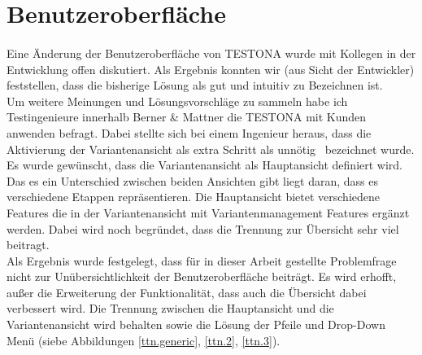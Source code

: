 \newpage
\section{Benutzeroberfläche}
\paragraph{}



Eine Änderung der Benutzeroberfläche von TESTONA wurde mit Kollegen in der Entwicklung offen diskutiert. Als Ergebnis konnten wir (aus Sicht der Entwickler) feststellen, dass die bisherige Lösung als gut und intuitiv zu Bezeichnen ist.\\

Um weitere Meinungen und Lösungsvorschläge zu sammeln habe ich Testingenieure innerhalb Berner \& Mattner die TESTONA mit Kunden anwenden befragt. Dabei stellte sich bei einem Ingenieur heraus, dass die Aktivierung der Variantenansicht als extra Schritt als \glqq unnötig\grqq~ bezeichnet wurde. Es wurde gewünscht, dass die Variantenansicht als Hauptansicht definiert wird. Das es ein Unterschied zwischen beiden Ansichten gibt liegt daran, dass es verschiedene Etappen repräsentieren. Die Hauptansicht bietet verschiedene Features die in der Variantenansicht mit Variantenmanagement Features ergänzt werden. Dabei wird noch begründet, dass die Trennung zur Übersicht sehr viel beitragt.\\

Als Ergebnis wurde festgelegt, dass für in dieser Arbeit gestellte Problemfrage nicht zur Unübersichtlichkeit der Benutzeroberfläche beiträgt. Es wird erhofft, außer die Erweiterung der Funktionalität, dass auch die Übersicht dabei verbessert wird. Die Trennung zwischen die Hauptansicht und die Variantenansicht wird behalten sowie die Lösung der Pfeile und Drop-Down Menü (siebe Abbildungen \ref{ttn.generic}, \ref{ttn.2}, \ref{ttn.3}).
